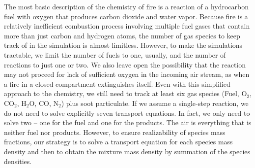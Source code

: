 The most basic description of the chemistry of fire is a reaction of a hydrocarbon fuel with oxygen that produces carbon dioxide and water vapor. Because fire is a relatively inefficient combustion process involving multiple fuel gases that contain more than just carbon and hydrogen atoms, the number of gas species to keep track of in the simulation is almost limitless. However, to make the simulations tractable, we limit the number of fuels to one, usually, and the number of reactions to just one or two. We also leave open the possibility that the reaction may not proceed for lack of sufficient oxygen in the incoming air stream, as when a fire in a closed compartment extinguishes itself. Even with this simplified approach to the chemistry, we still need to track at least six gas species (Fuel, O$_2$, CO$_2$, H$_2$O, CO, N$_2$) plus soot particulate. If we assume a single-step reaction, we do not need to solve explicitly seven transport equations. In fact, we only need to solve two -- one for the fuel and one for the products. The air is everything that is neither fuel nor products. However, to ensure realizability of species mass fractions, our strategy is to solve a transport equation for each species mass density and then to obtain the mixture mass density by summation of the species densities.

